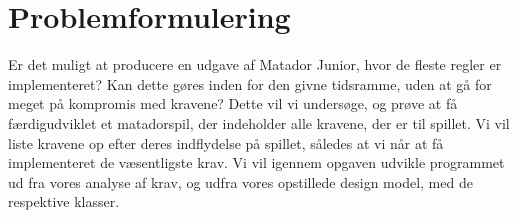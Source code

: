 \chapter{Problemformulering}
Er det muligt at producere en udgave af Matador Junior, hvor de fleste regler er implementeret? Kan dette gøres inden for den givne tidsramme, uden at gå for meget på kompromis med kravene? Dette vil vi undersøge, og prøve at få færdigudviklet et matadorspil, der indeholder alle kravene, der er til spillet. Vi vil liste kravene op efter deres indflydelse på spillet, således at vi når at få implementeret de væsentligste krav. Vi vil igennem opgaven udvikle programmet ud fra vores analyse af krav, og udfra vores opstillede design model, med de respektive klasser.
